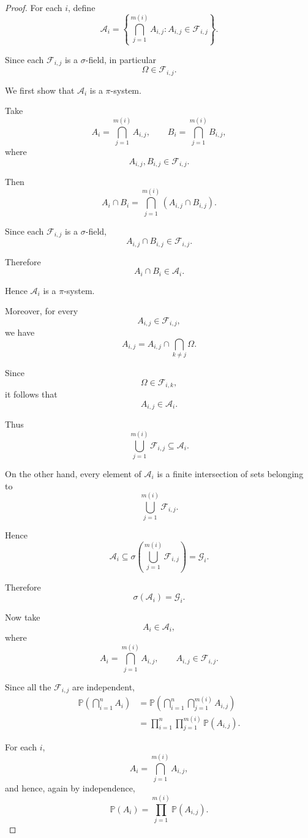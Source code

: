 \begin{proof}

For each $i$, define
\[
\mathcal{A}_i
=
\left\{
\bigcap_{j=1}^{m(i)}A_{i,j}
:
A_{i,j}\in\mathcal{F}_{i,j}
\right\}.
\]

Since each $\mathcal{F}_{i,j}$ is a $\sigma$-field, in particular
\[
\Omega\in\mathcal{F}_{i,j}.
\]

We first show that $\mathcal{A}_i$ is a $\pi$-system.

Take
\[
A_i=\bigcap_{j=1}^{m(i)}A_{i,j},
\qquad
B_i=\bigcap_{j=1}^{m(i)}B_{i,j},
\]
where
\[
A_{i,j},B_{i,j}\in\mathcal{F}_{i,j}.
\]

Then
\[
A_i\cap B_i
=
\bigcap_{j=1}^{m(i)}
(A_{i,j}\cap B_{i,j}).
\]

Since each $\mathcal{F}_{i,j}$ is a $\sigma$-field,
\[
A_{i,j}\cap B_{i,j}\in\mathcal{F}_{i,j}.
\]

Therefore
\[
A_i\cap B_i\in\mathcal{A}_i.
\]

Hence $\mathcal{A}_i$ is a $\pi$-system.

Moreover, for every
\[
A_{i,j}\in\mathcal{F}_{i,j},
\]
we have
\[
A_{i,j}
=
A_{i,j}
\cap
\bigcap_{k\neq j}\Omega.
\]

Since
\[
\Omega\in\mathcal{F}_{i,k},
\]
it follows that
\[
A_{i,j}\in\mathcal{A}_i.
\]

Thus
\[
\bigcup_{j=1}^{m(i)}\mathcal{F}_{i,j}
\subseteq
\mathcal{A}_i.
\]

On the other hand, every element of $\mathcal{A}_i$ is a finite
intersection of sets belonging to
\[
\bigcup_{j=1}^{m(i)}\mathcal{F}_{i,j}.
\]

Hence
\[
\mathcal{A}_i
\subseteq
\sigma\left(
\bigcup_{j=1}^{m(i)}\mathcal{F}_{i,j}
\right)
=
\mathcal{G}_i.
\]

Therefore
\[
\sigma(\mathcal{A}_i)=\mathcal{G}_i.
\]

\medskip

Now take
\[
A_i\in\mathcal{A}_i,
\]
where
\[
A_i
=
\bigcap_{j=1}^{m(i)}A_{i,j},
\qquad
A_{i,j}\in\mathcal{F}_{i,j}.
\]

Since all the $\mathcal{F}_{i,j}$ are independent,
\[
\begin{aligned}
\mathbb{P}\left(
\bigcap_{i=1}^{n}A_i
\right)
&=
\mathbb{P}\left(
\bigcap_{i=1}^{n}
\bigcap_{j=1}^{m(i)}
A_{i,j}
\right)\\
&=
\prod_{i=1}^{n}
\prod_{j=1}^{m(i)}
\mathbb{P}(A_{i,j}).
\end{aligned}
\]

For each $i$,
\[
A_i
=
\bigcap_{j=1}^{m(i)}A_{i,j},
\]
and hence, again by independence,
\[
\mathbb{P}(A_i)
=
\prod_{j=1}^{m(i)}
\mathbb{P}(A_{i,j}).
\]


\end{proof}
